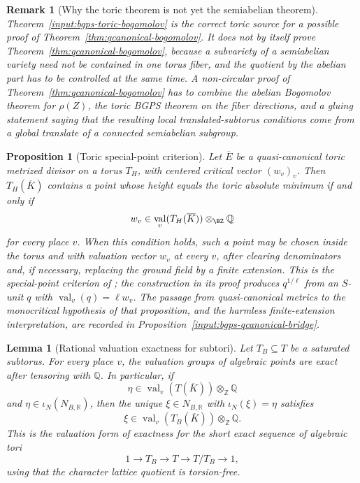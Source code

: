 \documentclass[10pt,a4paper]{amsart}
\theoremstyle{plain}
\newtheorem{lemma}[theorem]{Lemma}
\newtheorem{proposition}[theorem]{Proposition}
\newtheorem{remark}[theorem]{Remark}
\DeclareMathOperator{\val}{val}
\newcommand{\BQ}{{\mathbb {Q}}} \newcommand{\BR}{{\mathbb {R}}}
\theoremstyle{plain}
\numberwithin{equation}{section}
\providecommand{\bE}{\overline{E}}
\begin{document}
\begin{remark}[Why the toric theorem is not yet the semiabelian theorem]
	\label{rem:toric-bogomolov-bridge-gap}
	Theorem~\ref{input:bgps-toric-bogomolov} is the correct toric source for a
	possible proof of Theorem~\ref{thm:qcanonical-bogomolov}.  It does not by
	itself prove Theorem~\ref{thm:qcanonical-bogomolov}, because a subvariety of a semiabelian variety need
	not be contained in one torus fiber, and the quotient by the abelian part has
	to be controlled at the same time.  A non-circular proof of
	Theorem~\ref{thm:qcanonical-bogomolov} has to combine the abelian Bogomolov theorem for
	\(\rho(Z)\), the toric BGPS theorem on the fiber directions, and a gluing
	statement saying that the resulting local translated-subtorus conditions come
	from a global translate of a connected semiabelian subgroup.
\end{remark}

\begin{proposition}[Toric special-point criterion]
	\label{input:toric-special-point}
	Let \(\bE\) be a quasi-canonical toric metrized divisor on a torus \(T_H\), with
	centered critical vector \((w_v)_v\).  Then \(T_H(\overline K)\) contains a
	point whose height equals the toric absolute minimum if and only if
	\[
	w_v\in \val_v(T_H(\overline K))\otimes_{\BZ}\BQ
	\]
	for every place \(v\).  When this condition holds, such a point may be chosen
	inside the torus and with valuation vector \(w_v\) at every \(v\), after
	clearing denominators and, if necessary, replacing the ground field by a finite
	extension.  This is the special-point criterion of
	\cite[Proposition 5.13]{BGPS19}; the construction in its proof produces
	\(q^{1/\ell}\) from an \(S\)-unit \(q\) with
	\(\val_v(q)=\ell w_v\).  The passage from quasi-canonical metrics to the
	monocritical hypothesis of that proposition, and the harmless finite-extension
	interpretation, are recorded in Proposition~\ref{input:bgps-qcanonical-bridge}.
\end{proposition}

\begin{lemma}[Rational valuation exactness for subtori]
	\label{lem:rational-valuation-subtorus}
	Let \(T_B\subseteq T\) be a saturated subtorus.  For every place \(v\), the
	valuation groups of algebraic points are exact after tensoring with
	\(\mathbb Q\).  In particular, if
	\[
	\eta\in \val_v(T(\overline K))\otimes_{\mathbb Z}\mathbb Q
	\]
	and \(\eta\in \iota_N(N_{B,\mathbb R})\), then the unique
	\(\xi\in N_{B,\mathbb R}\) with \(\iota_N(\xi)=\eta\) satisfies
	\[
	\xi\in \val_v(T_B(\overline K))\otimes_{\mathbb Z}\mathbb Q.
	\]
	This is the valuation form of exactness for the short exact sequence of
	algebraic tori
	\[
	1\to T_B\to T\to T/T_B\to1,
	\]
	using that the character lattice quotient is torsion-free.
\end{lemma}
\end{document}
